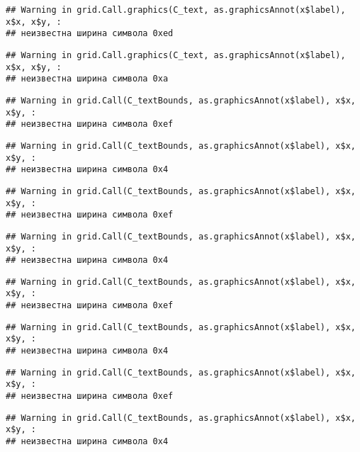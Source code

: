 \documentclass[
]{article}
\begin{document}
\begin{verbatim}
## Warning in grid.Call.graphics(C_text, as.graphicsAnnot(x$label), x$x, x$y, :
## неизвестна ширина символа 0xed
\end{verbatim}

\begin{verbatim}
## Warning in grid.Call.graphics(C_text, as.graphicsAnnot(x$label), x$x, x$y, :
## неизвестна ширина символа 0xa
\end{verbatim}

\begin{verbatim}
## Warning in grid.Call(C_textBounds, as.graphicsAnnot(x$label), x$x, x$y, :
## неизвестна ширина символа 0xef
\end{verbatim}

\begin{verbatim}
## Warning in grid.Call(C_textBounds, as.graphicsAnnot(x$label), x$x, x$y, :
## неизвестна ширина символа 0x4
\end{verbatim}

\begin{verbatim}
## Warning in grid.Call(C_textBounds, as.graphicsAnnot(x$label), x$x, x$y, :
## неизвестна ширина символа 0xef
\end{verbatim}

\begin{verbatim}
## Warning in grid.Call(C_textBounds, as.graphicsAnnot(x$label), x$x, x$y, :
## неизвестна ширина символа 0x4
\end{verbatim}

\begin{verbatim}
## Warning in grid.Call(C_textBounds, as.graphicsAnnot(x$label), x$x, x$y, :
## неизвестна ширина символа 0xef
\end{verbatim}

\begin{verbatim}
## Warning in grid.Call(C_textBounds, as.graphicsAnnot(x$label), x$x, x$y, :
## неизвестна ширина символа 0x4
\end{verbatim}

\begin{verbatim}
## Warning in grid.Call(C_textBounds, as.graphicsAnnot(x$label), x$x, x$y, :
## неизвестна ширина символа 0xef
\end{verbatim}

\begin{verbatim}
## Warning in grid.Call(C_textBounds, as.graphicsAnnot(x$label), x$x, x$y, :
## неизвестна ширина символа 0x4
\end{verbatim}
\end{document}
